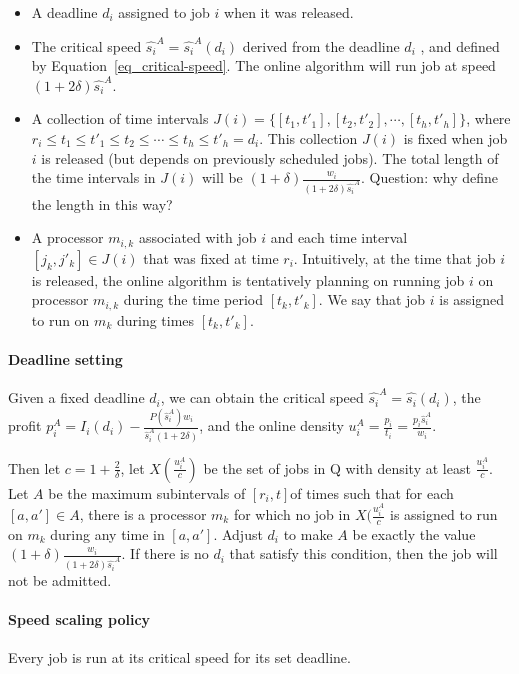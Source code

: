 \documentclass[10 pt,final]{article}
\newcommand{\question}[1]{{\color{blue} #1}}
\begin{document}
\begin{itemize}
\item A deadline $d_i$ assigned to job $i$ when it was released.
\item The critical speed $\hat{s_i}^A = \hat{s_i}^A(d_i)$ derived from the deadline $d_i$ , and defined by Equation~\ref{eq_critical-speed}. The online algorithm will run job at speed $(1+2 \delta)\hat{s_i}^A$.
\item A collection of time intervals $J(i) = \{[t_1,t'_1], [t_2, t'_2], \cdots, [t_h, t'_h]\}$, where $r_i \leq t_1 \leq t'_1 \leq t_2 \leq \cdots \leq t_h \leq t'_h = d_i$. This collection $J(i)$ is fixed when job $i$ is released (but depends on previously scheduled jobs). The total length of the time intervals in $J(i)$ will be $(1+\delta) \frac{w_i}{(1+2\delta)\hat{s_i}^A}$.
\question{Question: why define the length in this way?}
\item A processor $m_{i,k}$ associated with job $i$ and each time interval $[j_k,j'_k] \in J(i)$ that was fixed at time $r_i$. Intuitively, at the time that job $i$ is released, the online algorithm is tentatively planning on running job $i$ on processor $m_{i,k}$ during the time period $[t_k, t'_k]$. We say that job $i$ is assigned to run on $m_k$ during times $[t_k, t'_k]$.
\end{itemize}

\paragraph{Deadline setting} Given a fixed deadline $d_i$, we can obtain the critical speed $\hat{s_i}^A = \hat{s_i}(d_i)$, the profit $p^A_i = I_i(d_i) - \frac{P(\hat{s}^A_i) w_i}{\hat{s}^A_i (1+2\delta)}$, and the online density $u^A_i = \frac{p_i}{t_i} = \frac{p_i \hat{s}^A_i}{w_i}$. 

Then let $c= 1 + \frac{2}{\delta}$, let $X(\frac{u^A_i}{c})$ be the set of jobs in Q with density at least $\frac{u^A_i}{c}$. Let $A$ be the maximum subintervals of $[r_i,t]$of times such that for each $[a,a'] \in A$, there is a processor $m_k$ for which no job in $X(\frac{u^A_i}{c}$ is assigned to run on $m_k$ during any time in $[a,a']$. Adjust $d_i$ to make $A$ be exactly the value $(1+\delta) \frac{w_i}{(1+2\delta)\hat{s_i}^A}$. If there is no $d_i$ that satisfy this condition, then the job will not be admitted.

\paragraph{Speed scaling policy} Every job is run at its critical speed for its set deadline.
\end{document}
